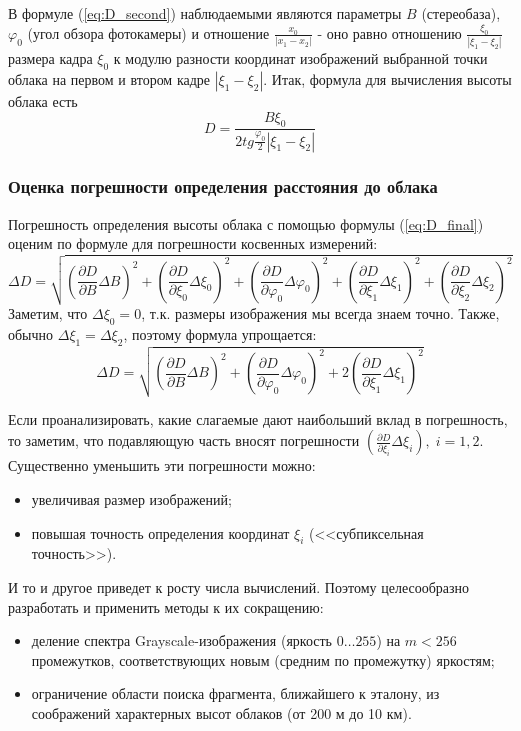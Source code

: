 В формуле (\ref{eq:D_second}) наблюдаемыми являются параметры $B$ (стереобаза), $\varphi_0$ (угол обзора фотокамеры) и отношение $\frac{x_0}{|x_1-x_2|}$ - оно равно отношению $\frac{\xi_0}{|\xi_1 - \xi_2|}$ размера кадра $\xi_0$ к модулю разности координат изображений
выбранной точки облака на первом и втором кадре $|\xi_1 - \xi_2|$. Итак, формула для вычисления высоты облака есть
\begin{equation}\label{eq:D_final}
  D = \frac{B\xi_0}{2tg\frac{\varphi_0}{2}|\xi_1 - \xi_2|}
\end{equation}

%
%

\subsubsection{Оценка погрешности определения расстояния до облака}

Погрешность определения высоты облака с помощью формулы (\ref{eq:D_final}) оценим по формуле для погрешности косвенных измерений:
\begin{equation*}
    \Delta D =  \sqrt{ (\frac{\partial D}{\partial B}\Delta B)^2 + (\frac{\partial D}{\partial \xi_0}\Delta \xi_0)^2 + (\frac{\partial D}{\partial \varphi_0}\Delta \varphi_0)^2 + (\frac{\partial D}{\partial \xi_1}\Delta \xi_1)^2 + (\frac{\partial D}{\partial \xi_2}\Delta \xi_2)^2 }
\end{equation*}
Заметим, что $\Delta \xi_0 = 0$, т.к. размеры изображения мы всегда знаем точно. Также, обычно $\Delta \xi_1 = \Delta \xi_2$, поэтому формула упрощается:
\begin{equation*}
    \Delta D =  \sqrt{ (\frac{\partial D}{\partial B}\Delta B)^2 + (\frac{\partial D}{\partial \varphi_0}\Delta \varphi_0)^2 + 2(\frac{\partial D}{\partial \xi_1}\Delta \xi_1)^2}
\end{equation*}

Если проанализировать, какие слагаемые дают наибольший вклад в погрешность, то заметим, что подавляющую часть вносят погрешности  $(\frac{\partial D}{\partial \xi_i}\Delta \xi_i), \; i=1,2.$  Существенно уменьшить эти погрешности можно:
\begin{itemize}
\item увеличивая размер изображений;
\item повышая точность определения координат $\xi_i$ (<<субпиксельная точность>>).
\end{itemize}
И то и другое приведет к росту числа вычислений. Поэтому целесообразно разработать и применить методы к их сокращению:
\begin{itemize}
\item деление спектра Grayscale-изображения (яркость $0 \dots 255$) на $m < 256$ промежутков, соответствующих новым (средним по промежутку) яркостям;
\item ограничение области поиска фрагмента, ближайшего к эталону, из соображений характерных высот облаков (от 200 м до 10 км).
\end{itemize}

